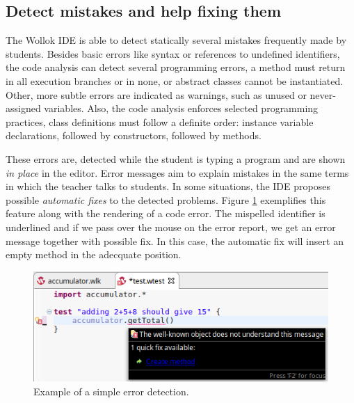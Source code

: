 \subsection{Detect mistakes and help fixing them}
\label{sec:detectMistakes}
The Wollok IDE is able to detect statically several mistakes frequently made by students. 
Besides basic errors like syntax or references to undefined identifiers, 
the code analysis can detect several programming errors, 
\eg a method must return in all execution branches or in none,
or abstract classes cannot be instantiated.
Other, more subtle errors are indicated as warnings,
such as unused or never-assigned variables.
Also, the code analysis enforces selected programming practices, 
\eg class definitions must follow a definite order: 
instance variable declarations, followed by constructors, followed by methods. 

These errors are, detected while the student is typing a program and are shown \emph{in place} in the editor.
Error messages aim to explain mistakes in the same terms in which the teacher talks to students.
In some situations, the IDE proposes possible \emph{automatic fixes} to the detected problems.
Figure \ref{fig:errorReporting} exemplifies this feature along with the rendering of a code error. 
The mispelled identifier is underlined and if we pass over the mouse on the error report, 
we get an error message together with possible fix.
In this case, the automatic fix will insert an empty method in the adecquate position. 

\begin{figure}[ht]
\vspace{-2mm}
\centering
\includegraphics[scale=0.45, trim={0 0 0.15cm 0},clip]{images/errorReporting.png}
\vspace{-2mm}
\caption{\small Example of a simple error detection.}
\label{fig:errorReporting}
\vspace{-3mm}
\end{figure}

